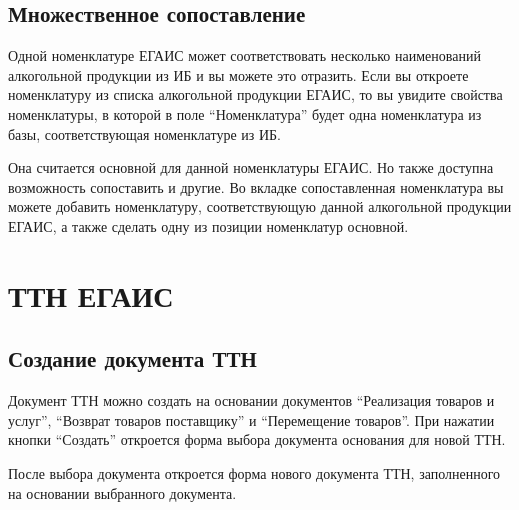 \documentclass[letterpaper,10pt,russian]{sphinxmanual}
\begin{document}
\section{Множественное сопоставление}
\label{alcprod:id3}
Одной номенклатуре ЕГАИС может соответствовать несколько наименований алкогольной продукции из ИБ и вы можете это отразить. Если вы откроете номенклатуру из списка алкогольной продукции ЕГАИС, то вы увидите свойства номенклатуры, в которой в поле ``Номенклатура'' будет одна номенклатура из базы, соответствующая номенклатуре из ИБ.
\begin{figure}[htbp]
\centering

\noindent{}
\end{figure}

Она считается основной для данной номенклатуры ЕГАИС. Но также доступна возможность сопоставить и другие. Во вкладке сопоставленная номенклатура вы можете добавить номенклатуру, соответствующую данной алкогольной продукции ЕГАИС, а также сделать одну из позиции номенклатур основной.
\begin{figure}[htbp]
\centering

\noindent{}
\end{figure}


\chapter{ТТН ЕГАИС}
\label{ttn::doc}\label{ttn:id1}

\section{Создание документа ТТН}
\label{ttn:id2}
Документ ТТН можно создать на основании документов ``Реализация товаров и услуг'', ``Возврат товаров поставщику'' и ``Перемещение товаров''.
При нажатии кнопки ``Создать'' откроется форма выбора документа основания для новой ТТН.
\begin{figure}[htbp]
\centering

\noindent{}
\end{figure}

После выбора документа откроется форма нового документа ТТН, заполненного на основании выбранного документа.
\begin{figure}[htbp]
\centering

\noindent{}
\end{figure}
\begin{figure}[htbp]
\centering

\noindent{}
\end{figure}
\end{document}

